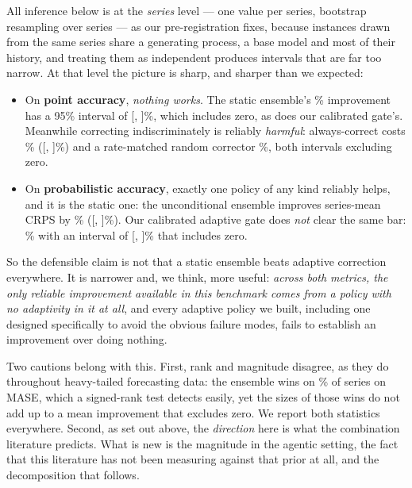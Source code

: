 All inference below is at the \emph{series} level --- one value per series, bootstrap
resampling over series --- as our pre-registration fixes, because instances drawn from
the same series share a generating process, a base model and most of their history, and
treating them as independent produces intervals that are far too narrow. At that level
the picture is sharp, and sharper than we expected:

\begin{itemize}
  \item On \textbf{point accuracy}, \emph{nothing works}. The static ensemble's
  \maseAlwaysEnsembleVsNeverPct\% improvement has a 95\% interval of
  [\maseAlwaysEnsembleVsNeverCIlo, \maseAlwaysEnsembleVsNeverCIhi]\%, which includes zero, as does
  our calibrated gate's. Meanwhile correcting indiscriminately is reliably
  \emph{harmful}: always-correct costs \maseAlwaysCorrectVsNeverPct\%
  ([\maseAlwaysCorrectVsNeverCIlo, \maseAlwaysCorrectVsNeverCIhi]\%) and a
  rate-matched random corrector \maseRandomCorrectVsNeverPct\%, both intervals excluding zero.
  \item On \textbf{probabilistic accuracy}, exactly one policy of any kind reliably
  helps, and it is the static one: the unconditional ensemble improves series-mean CRPS
  by \crpsAlwaysEnsembleVsNeverAbs\% ([\crpsAlwaysEnsembleVsNeverAbsCIlo,
  \crpsAlwaysEnsembleVsNeverAbsCIhi]\%). Our calibrated adaptive gate does \emph{not} clear the
  same bar: \crpsRgcCalibratedVsNeverPct\% with an interval of [\crpsRgcCalibratedVsNeverCIlo,
  \crpsRgcCalibratedVsNeverCIhi]\% that includes zero.
\end{itemize}

So the defensible claim is not that a static ensemble beats adaptive correction
everywhere. It is narrower and, we think, more useful: \emph{across both metrics, the
only reliable improvement available in this benchmark comes from a policy with no
adaptivity in it at all}, and every adaptive policy we built, including one designed
specifically to avoid the obvious failure modes, fails to establish an improvement
over doing nothing.

Two cautions belong with this. First, rank and magnitude disagree, as they do throughout
heavy-tailed forecasting data: the ensemble wins on \maseAlwaysEnsembleVsNeverWinRate\% of series on
MASE, which a signed-rank test detects easily, yet the sizes of those wins do not add up
to a mean improvement that excludes zero. We report both statistics everywhere. Second, as set out above, the \emph{direction}
here is what the combination literature predicts. What is new is the magnitude in the
agentic setting, the fact that this literature has not been measuring against that prior
at all, and the decomposition that follows.

